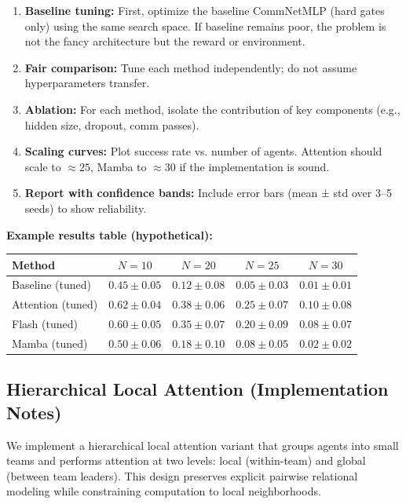 \begin{enumerate}
    \item \textbf{Baseline tuning:} First, optimize the baseline CommNetMLP (hard gates only) using the same search space. If baseline remains poor, the problem is not the fancy architecture but the reward or environment.
    \item \textbf{Fair comparison:} Tune each method independently; do not assume hyperparameters transfer.
    \item \textbf{Ablation:} For each method, isolate the contribution of key components (e.g., hidden size, dropout, comm passes).
    \item \textbf{Scaling curves:} Plot success rate vs. number of agents. Attention should scale to $\approx 25$, Mamba to $\approx 30$ if the implementation is sound.
    \item \textbf{Report with confidence bands:} Include error bars (mean ± std over 3--5 seeds) to show reliability.
\end{enumerate}

\textbf{Example results table (hypothetical):}

\begin{table}[h]
\centering
\begin{tabular}{|l|c|c|c|c|}
\hline
\textbf{Method} & $N=10$ & $N=20$ & $N=25$ & $N=30$ \\
\hline
Baseline (tuned) & $0.45 \pm 0.05$ & $0.12 \pm 0.08$ & $0.05 \pm 0.03$ & $0.01 \pm 0.01$ \\
Attention (tuned) & $0.62 \pm 0.04$ & $0.38 \pm 0.06$ & $0.25 \pm 0.07$ & $0.10 \pm 0.08$ \\
Flash (tuned) & $0.60 \pm 0.05$ & $0.35 \pm 0.07$ & $0.20 \pm 0.09$ & $0.08 \pm 0.07$ \\
Mamba (tuned) & $0.50 \pm 0.06$ & $0.18 \pm 0.10$ & $0.08 \pm 0.05$ & $0.02 \pm 0.02$ \\
\hline
\end{tabular}
\end{table}

\subsection{Hierarchical Local Attention (Implementation Notes)}
\label{subsec:hier_local}

We implement a hierarchical local attention variant that groups agents into small teams and performs attention at two levels: local (within-team) and global (between team leaders). This design preserves explicit pairwise relational modeling while constraining computation to local neighborhoods.


